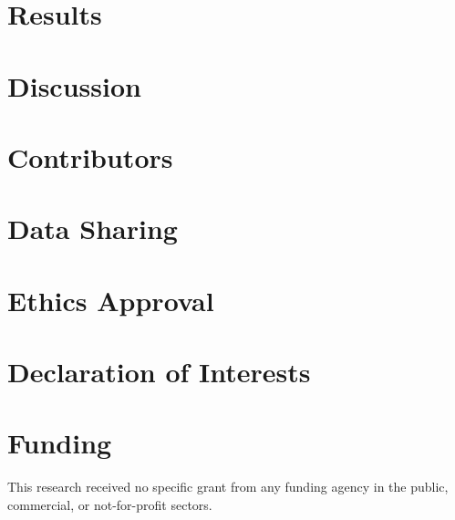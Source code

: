 \documentclass[review,12pt,times,nopreprintline]{elsarticle}
\begin{document}
\section{Results}


\section{Discussion}


\section*{Contributors}


\section*{Data Sharing}


\section*{Ethics Approval}


\section*{Declaration of Interests}


\section*{Funding}
This research received no specific grant from any funding agency in the public, commercial, or not-for-profit sectors.



\end{document}
